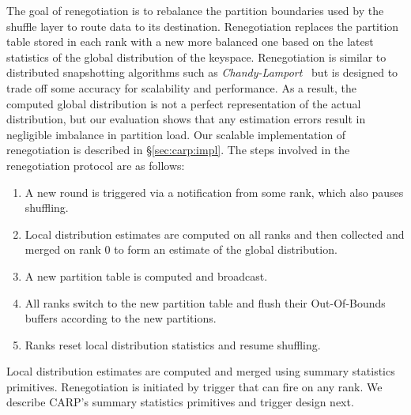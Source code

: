 The goal of renegotiation is to rebalance the partition boundaries used by the shuffle layer to
route data to its destination.
Renegotiation replaces the partition table stored in each rank with a new more balanced one based
on the latest statistics of the global distribution of the keyspace.
Renegotiation is similar to distributed snapshotting algorithms such as
\emph{Chandy-Lamport}~\cite{Chandy1985:DistributedSnapshotsDetermining} but is designed to trade
off some accuracy for scalability and performance.
As a result, the computed global distribution is not a perfect representation of the actual
distribution, but our evaluation shows that any estimation errors result in negligible imbalance in
partition load.
Our scalable implementation of renegotiation is described in \S\ref{sec:carp:impl}.
The steps involved in the renegotiation protocol are as follows:

\figdeshist

\begin{enumerate}
  \item A new round is triggered via a notification from some rank, which also pauses shuffling.
  \item Local distribution estimates are computed on all ranks and then collected and merged on rank
        0 to form an estimate of the global distribution.
  \item A new partition table is computed and broadcast.
  \item All ranks switch to the new partition table and flush their Out-Of-Bounds buffers according
        to the new partitions.
  \item Ranks reset local distribution statistics and resume shuffling.
\end{enumerate}

Local distribution estimates are computed and merged using summary statistics primitives.
Renegotiation is initiated by trigger that can fire on any rank.
We describe CARP's summary statistics primitives and trigger design next.

